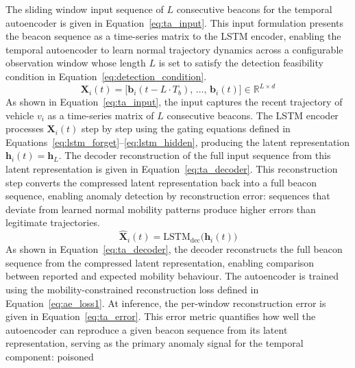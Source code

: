 \documentclass[12pt, a4paper]{report}
\begin{document}
The sliding window input sequence of $L$ consecutive beacons for the
temporal autoencoder is given in Equation~\ref{eq:ta_input}.
\newline
\newline
This input formulation presents the beacon sequence as a time-series
matrix to the LSTM encoder, enabling the temporal autoencoder to learn
normal trajectory dynamics across a configurable observation window
whose length $L$ is set to satisfy the detection feasibility condition
in Equation~\ref{eq:detection_condition}.
\begin{equation}
  \mathbf{X}_i(t) = \bigl[\mathbf{b}_i(t-L\cdot T_b),\,\ldots,\,
                            \mathbf{b}_i(t)\bigr]
                    \in \mathbb{R}^{L\times d}
  \label{eq:ta_input}
\end{equation}
As shown in Equation~\ref{eq:ta_input}, the input captures the recent
trajectory of vehicle $v_i$ as a time-series matrix of $L$ consecutive
beacons. The LSTM encoder processes $\mathbf{X}_i(t)$ step by step
using the gating equations defined in
Equations~\ref{eq:lstm_forget}--\ref{eq:lstm_hidden}, producing the
latent representation $\mathbf{h}_i(t) = \mathbf{h}_L$.
\newline
\newline
The decoder
reconstruction of the full input sequence from this latent
representation is given in Equation~\ref{eq:ta_decoder}. This reconstruction step converts the compressed latent
representation back into a full beacon sequence, enabling anomaly
detection by reconstruction error: sequences that deviate from
learned normal mobility patterns produce higher errors than
legitimate trajectories.
\begin{equation}
  \hat{\mathbf{X}}_i(t) =
    \mathrm{LSTM}_{\mathrm{dec}}\!\bigl(\mathbf{h}_i(t)\bigr)
  \label{eq:ta_decoder}
\end{equation}
As shown in Equation~\ref{eq:ta_decoder}, the decoder reconstructs
the full beacon sequence from the compressed latent representation,
enabling comparison between reported and expected mobility behaviour.
The autoencoder is trained using the mobility-constrained
reconstruction loss defined in Equation~\ref{eq:ae_loss1}.
\newline
\newline
At
inference, the per-window reconstruction error is given in
Equation~\ref{eq:ta_error}. This error metric quantifies how well the autoencoder can reproduce
a given beacon sequence from its latent representation, serving as
the primary anomaly signal for the temporal component: poisoned
\end{document}
